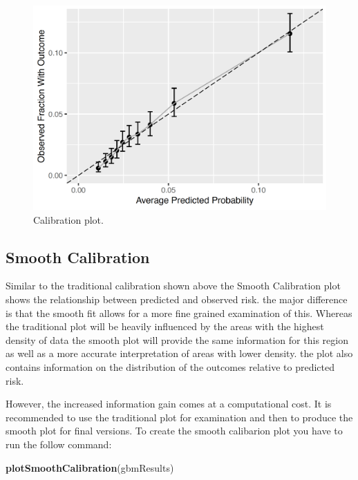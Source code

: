 \documentclass[11pt]{book}
\newenvironment{Shaded}{\begin{snugshade}}{\end{snugshade}}
\newcommand{\KeywordTok}[1]{\textcolor[rgb]{0.13,0.29,0.53}{\textbf{#1}}}
\newcommand{\NormalTok}[1]{#1}
\begin{document}
\begin{figure}

{\centering \includegraphics[width=0.9\linewidth]{images/PatientLevelPrediction/sparseCalibration} 

}

\caption{Calibration plot.}\label{fig:plpCalibration}
\end{figure}

\subsection{Smooth Calibration}\label{smooth-calibration}

Similar to the traditional calibration shown above the Smooth
Calibration plot shows the relationship between predicted and observed
risk. the major difference is that the smooth fit allows for a more fine
grained examination of this. Whereas the traditional plot will be
heavily influenced by the areas with the highest density of data the
smooth plot will provide the same information for this region as well as
a more accurate interpretation of areas with lower density. the plot
also contains information on the distribution of the outcomes relative
to predicted risk.

However, the increased information gain comes at a computational cost.
It is recommended to use the traditional plot for examination and then
to produce the smooth plot for final versions. To create the smooth
calibarion plot you have to run the follow command:

\begin{Shaded}
\begin{Highlighting}[]
\KeywordTok{plotSmoothCalibration}\NormalTok{(gbmResults)}
\end{Highlighting}
\end{Shaded}
\end{document}
